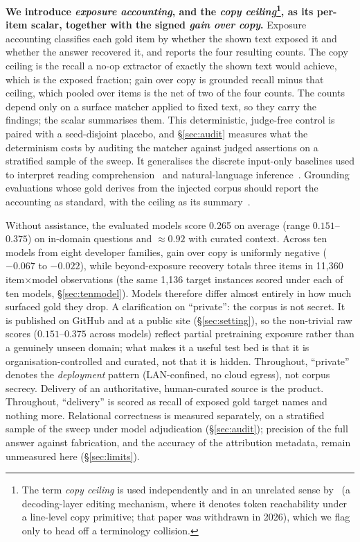 \documentclass[10pt,twocolumn]{article}
\begin{document}
\textbf{We introduce \emph{exposure accounting}, and the \emph{copy ceiling}\footnote{The term \emph{copy ceiling} is used independently and in an unrelated sense by~\textcite{copyasdecode2026} (a decoding-layer editing mechanism, where it denotes token reachability under a line-level copy primitive; that paper was withdrawn in 2026), which we flag only to head off a terminology collision.}, as its per-item scalar, together with the signed \emph{gain over copy}.} Exposure accounting classifies each gold item by whether the shown text exposed it and whether the answer recovered it, and reports the four resulting counts. The copy ceiling is the recall a no-op extractor of exactly the shown text would achieve, which is the exposed fraction; gain over copy is grounded recall minus that ceiling, which pooled over items is the net of two of the four counts. The counts depend only on a surface matcher applied to fixed text, so they carry the findings; the scalar summarises them. This deterministic, judge-free control is paired with a seed-disjoint placebo, and \S\ref{sec:audit} measures what the determinism costs by auditing the matcher against judged assertions on a stratified sample of the sweep. It generalises the discrete input-only baselines used to interpret reading comprehension~\cite{kaushik2018reading} and natural-language inference~\cite{gururangan2018artifacts,poliak2018hypothesis}. Grounding evaluations whose gold derives from the injected corpus should report the accounting as standard, with the ceiling as its summary~\cite{laitenberger2025stronger,min2023factscore}.

Without assistance, the evaluated models score 0.265 on average (range $0.151$--$0.375$) on in-domain questions and $\approx0.92$ with curated context. Across ten models from eight developer families, gain over copy is uniformly negative ($-0.067$ to $-0.022$), while beyond-exposure recovery totals three items in 11{,}360 item$\times$model observations (the same 1{,}136 target instances scored under each of ten models, \S\ref{sec:tenmodel}). Models therefore differ almost entirely in how much surfaced gold they drop. A clarification on ``private'': the corpus is not secret. It is published on GitHub and at a public site (\S\ref{sec:setting}), so the non-trivial raw scores ($0.151$--$0.375$ across models) reflect partial pretraining exposure rather than a genuinely unseen domain; what makes it a useful test bed is that it is organisation-controlled and curated, not that it is hidden. Throughout, ``private'' denotes the \emph{deployment} pattern (LAN-confined, no cloud egress), not corpus secrecy. Delivery of an authoritative, human-curated source is the product. Throughout, ``delivery'' is scored as recall of exposed gold target names and nothing more. Relational correctness is measured separately, on a stratified sample of the sweep under model adjudication (\S\ref{sec:audit}); precision of the full answer against fabrication, and the accuracy of the attribution metadata, remain unmeasured here (\S\ref{sec:limits}).
\end{document}
